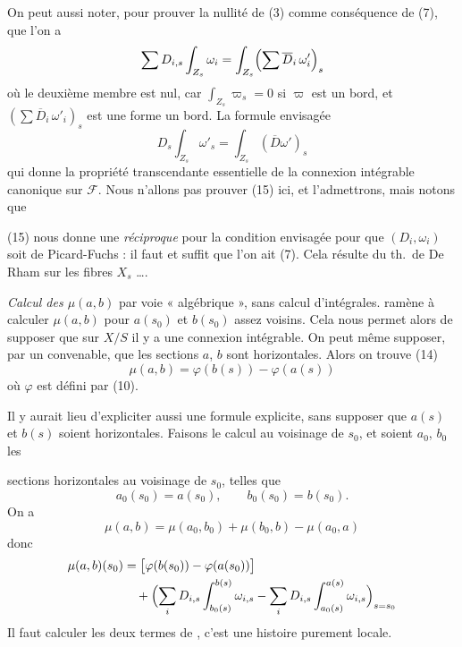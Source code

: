 \documentclass[11pt,a4paper]{article}
\begin{document}
On peut aussi noter,  pour prouver la  nullité
de (3) comme conséquence de (7), que l'on a
\[
  \sum D_{i,s} \int_{Z_s} \omega_i
  = \int_{Z_s} \Bigl(\sum \overline{D}_i\, \omega'_i\Bigr)_s
\]
où le deuxième membre est nul, car $\int_{Z_s} \varpi_s = 0$ si $\varpi$ est
un bord, et $(\sum \overline{D}_i\, \omega'_i)_s$ est une forme
 un bord. La formule envisagée \struck{\ill{}}
\add{\ill{}}
\[
  \boxed{\; D_s \int_{Z_s} \omega'_s = \int_{Z_s} (\overline{D}\omega')_s \;}
  \tag{15}
\]
qui donne la propriété transcendante essentielle de la connexion intégrable
canonique sur $\mathscr{F}$. Nous n'allons pas prouver (15) ici, et
l'admettrons, mais notons que

(15) nous donne une \emph{réciproque} pour la condition envisagée pour que
$(D_i, \omega_i)$ soit de Picard-Fuchs : il faut et suffit que l'on ait (7).
Cela résulte du th.\ de De Rham sur les fibres $X_s$ ….

\emph{Calcul des $\mu(a,b)$} par voie « algébrique », sans calcul
d'intégrales.   ramène à
calculer $\mu(a,b)$  pour 
$a(s_0)$ et $b(s_0)$ assez voisins. Cela nous permet alors de supposer que sur
$X/S$ il y a une connexion intégrable. On peut même supposer, par un
 convenable, que les sections $a$, $b$ sont horizontales.
Alors on trouve (14)
\[
  \mu(a,b) = \varphi(b(s)) - \varphi(a(s))
\]
où $\varphi$ est défini par (10).

Il y aurait lieu d'expliciter aussi une formule explicite, sans supposer que
$a(s)$ et $b(s)$ soient horizontales. Faisons le calcul au voisinage de
$s_0$, et soient $a_0$, $b_0$ les

sections horizontales au voisinage de $s_0$, telles que
\[
  a_0(s_0) = a(s_0) , \qquad b_0(s_0) = b(s_0) .
\]
On a
\[
  \mu(a,b) = \mu(a_0, b_0) + \mu(b_0, b) - \mu(a_0, a)
\]
donc
\begin{align*}
  \mu(a,b)(s_0) &= \bigl[\varphi(b(s_0)) - \varphi(a(s_0))\bigr] \\
  &\quad + \Bigl(\sum_i D_{i,s} \int_{b_0(s)}^{b(s)} \omega_{i,s}
  - \sum_i D_{i,s} \int_{a_0(s)}^{a(s)} \omega_{i,s}\Bigr)_{s = s_0}
\end{align*}
Il faut calculer les deux termes de \ill{} \ill{}, c'est une histoire
purement locale.
\end{document}
